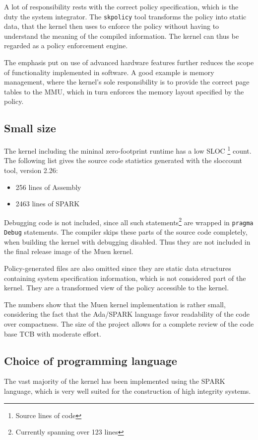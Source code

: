 A lot of responsibility rests with the correct policy specification, which is
the duty the system integrator. The \texttt{skpolicy} tool transforms the policy
into static data, that the kernel then uses to enforce the policy without having
to understand the meaning of the compiled information. The kernel can thus be
regarded as a policy enforcement engine.

The emphasis put on use of advanced hardware features further reduces the scope
of functionality implemented in software. A good example is memory management,
where the kernel's sole responsibility is to provide the correct page tables to
the MMU, which in turn enforces the memory layout specified by the policy.

\subsection{Small size}
The kernel including the mininal zero-footprint runtime has a low SLOC
\footnote{Source lines of code} count. The following list gives the source code
statistics generated with the sloccount tool, version 2.26:

\begin{itemize}
	\item 256 lines of Assembly
	\item 2463 lines of SPARK
\end{itemize}

Debugging code is not included, since all such statements\footnote{Currently
spanning over 123 lines} are wrapped in \texttt{pragma Debug} statements. The
compiler skips these parts of the source code completely, when building the
kernel with debugging disabled. Thus they are not included in the final release
image of the Muen kernel.

Policy-generated files are also omitted since they are static data structures
containing system specification information, which is not considered part of the
kernel. They are a transformed view of the policy accessible to the kernel.

The numbers show that the Muen kernel implementation is rather small,
considering the fact that the Ada/SPARK language favor readability of the code
over compactness. The size of the project allows for a complete review of the
code base TCB with moderate effort.

\subsection{Choice of programming language}
The vast majority of the kernel has been implemented using the SPARK language,
which is very well suited for the construction of high integrity systems.

